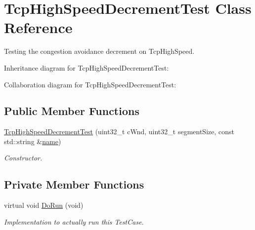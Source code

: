 \hypertarget{classTcpHighSpeedDecrementTest}{}\section{Tcp\+High\+Speed\+Decrement\+Test Class Reference}
\label{classTcpHighSpeedDecrementTest}


Testing the congestion avoidance decrement on Tcp\+High\+Speed.  




Inheritance diagram for Tcp\+High\+Speed\+Decrement\+Test\+:


Collaboration diagram for Tcp\+High\+Speed\+Decrement\+Test\+:
\subsection*{Public Member Functions}
\begin{DoxyCompactItemize}
\item 
\hyperlink{classTcpHighSpeedDecrementTest_afbdf229abb431406b3de91526abdb20b}{Tcp\+High\+Speed\+Decrement\+Test} (uint32\+\_\+t c\+Wnd, uint32\+\_\+t segment\+Size, const std\+::string \&\hyperlink{generate__test__data__lte__spectrum__model_8m_ab74e6bf80237ddc4109968cedc58c151}{name})
\begin{DoxyCompactList}\small\item\em Constructor. \end{DoxyCompactList}\end{DoxyCompactItemize}
\subsection*{Private Member Functions}
\begin{DoxyCompactItemize}
\item 
virtual void \hyperlink{classTcpHighSpeedDecrementTest_aaf06d64c6c5a5f7de4742fedb5f7f9eb}{Do\+Run} (void)
\begin{DoxyCompactList}\small\item\em Implementation to actually run this Test\+Case. \end{DoxyCompactList}\end{DoxyCompactItemize}
